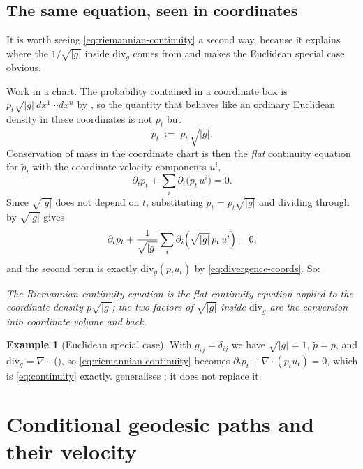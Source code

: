 \documentclass[11pt,a4paper]{report}
\theoremstyle{definition}
\newtheorem{example}[example]{Example}
\theoremstyle{remark}
\begin{document}
\subsection{The same equation, seen in coordinates}

It is worth seeing \eqref{eq:riemannian-continuity} a second way, because it
explains where the $1/\sqrt{|g|}$ inside $\mathrm{div}_g$ comes from and
makes the Euclidean special case obvious.

Work in a chart. The probability contained in a coordinate box is
$p_t\sqrt{|g|}\,dx^1\cdots dx^n$ by , so the
quantity that behaves like an ordinary Euclidean density in these
coordinates is not $p_t$ but
\[
\tilde p_t \;:=\; p_t\,\sqrt{|g|} .
\]
Conservation of mass in the coordinate chart is then the \emph{flat}
continuity equation for $\tilde p_t$ with the coordinate velocity
components $u^i$,
\[
\partial_t\tilde p_t + \sum_i\partial_i\bigl(\tilde p_t\,u^i\bigr) = 0 .
\]
Since $\sqrt{|g|}$ does not depend on $t$, substituting
$\tilde p_t=p_t\sqrt{|g|}$ and dividing through by $\sqrt{|g|}$ gives
\[
\partial_tp_t + \frac{1}{\sqrt{|g|}}\sum_i\partial_i\Bigl(\sqrt{|g|}\,p_t\,u^i\Bigr) = 0 ,
\]
and the second term is exactly $\mathrm{div}_g(p_tu_t)$ by
\eqref{eq:divergence-coords}. So:

\begin{center}
\emph{The Riemannian continuity equation is the flat continuity equation
applied to the coordinate density $p\sqrt{|g|}$; the two factors of
$\sqrt{|g|}$ inside $\mathrm{div}_g$ are the conversion into coordinate
volume and back.}
\end{center}

\begin{example}[Euclidean special case]
\label{ex:continuity-euclidean-case}
With $g_{ij}=\delta_{ij}$ we have $\sqrt{|g|}=1$, $\tilde p=p$, and
$\mathrm{div}_g=\nabla\cdot$ (), so
\eqref{eq:riemannian-continuity} becomes
$\partial_tp_t+\nabla\cdot(p_tu_t)=0$, which is \eqref{eq:continuity}
exactly.  generalises
; it does not replace it.
\end{example}

\section{Conditional geodesic paths and their velocity}
\label{sec:geodesic-path-general}
\end{document}
